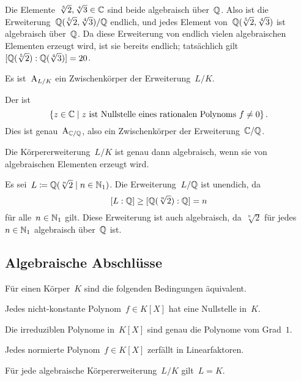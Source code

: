 \begin{example}
  Die Elemente~$\sqrt[5]{2}, \sqrt[4]{3} \in \mathbb{C}$ sind beide algebraisch über~$\mathbb{Q}$.
  Also ist die Erweiterung~$\mathbb{Q}(\sqrt[5]{2}, \sqrt[4]{3}) / \mathbb{Q}$ endlich, und jedes Element von~$\mathbb{Q}(\sqrt[5]{2}, \sqrt[4]{3})$ ist algebraisch über~$\mathbb{Q}$.
  Da diese Erweiterung von endlich vielen algebraischen Elementen erzeugt wird, ist sie bereits endlich;
  tatsächlich gilt~$[\mathbb{Q}(\sqrt[5]{2}) : \mathbb{Q}(\sqrt[4]{3})] = 20$.
\end{example}

\begin{corollary}
  Es ist~$\operatorname{A}_{L/K}$ ein Zwischenkörper der Erweiterung~$L/K$.
\end{corollary}

\begin{example}
  Der  ist
  \[
    \{
      z \in \Complex
    \suchthat
      \text{$z$ ist Nullstelle eines rationalen Polynoms~$f \neq 0$}
    \} \,.
  \]
  Dies ist genau~$\operatorname{A}_{\mathbb{C} / \mathbb{Q}}$, also ein Zwischenkörper der Erweiterung~$\mathbb{C} / \mathbb{Q}$.
\end{example}

\begin{corollary}
  Die Körpererweiterung~$L/K$ ist genau dann algebraisch, wenn sie von algebraischen Elementen erzeugt wird.
\end{corollary}

\begin{example}
  Es sei~$L \defined \Rational( \sqrt[n]{2} \suchthat n \in \Natural_1)$.
  Die Erweiterung~$L/\mathbb{Q}$ ist unendich, da
  \[
    [L : \mathbb{Q}]
    \geq
    [\mathbb{Q}(\sqrt[n]{2}) : \mathbb{Q}]
    =
    n
  \]
  für alle~$n \in \mathbb{N}_1$ gilt.
  Diese Erweiterung ist auch algebraisch, da~$\sqrt[n]{2}$ für jedes~$n \in \mathbb{N}_1$ algebraisch über~$\mathbb{Q}$ ist.
\end{example}



\subsection{Algebraische Abschlüsse}

\begin{proposition}
  \label{characterizations of algebraically closed field}
  Für einen Körper~$K$ sind die folgenden Bedingungen äquivalent.
  \begin{equivlist}
    \item
      Jedes nicht-konstante Polynom~$f \in K[X]$ hat eine Nullstelle in~$K$.
    \item
      Die irreduziblen Polynome in~$K[X]$ sind genau die Polynome vom Grad~$1$.
    \item
      Jedes normierte Polynom~$f \in K[X]$ zerfällt in Linearfaktoren.
    \item
      Für jede algebraische Körpererweiterung~$L/K$ gilt~$L = K$.
  \end{equivlist}
\end{proposition}

